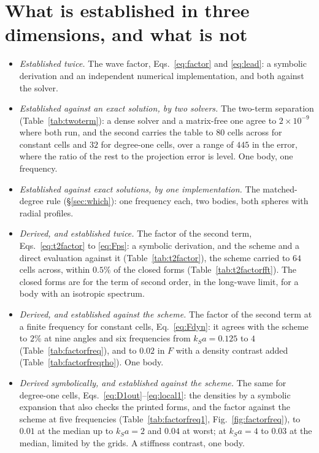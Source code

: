 \documentclass[11pt,a4paper]{article}
\begin{document}
\section{What is established in three dimensions, and what is not}\label{sec:status}

\begin{itemize}
\item \emph{Established twice.} The wave factor, Eqs.~\eqref{eq:factor} and \eqref{eq:lead}: a symbolic
derivation and an independent numerical implementation, and both against the solver.
\item \emph{Established against an exact solution, by two solvers.} The two-term separation
(Table~\ref{tab:twoterm}): a dense solver and a matrix-free one agree to $2\times10^{-9}$ where both
run, and the second carries the table to $80$ cells across for constant cells and $32$ for degree-one
cells, over a range of $445$ in the error, where the ratio of the rest to the projection error is level.
One body, one frequency.
\item \emph{Established against exact solutions, by one implementation.} The matched-degree rule
(\S\ref{sec:which}): one frequency each, two bodies, both spheres with radial profiles.
\item \emph{Derived, and established twice.} The factor of the second term, Eqs.~\eqref{eq:t2factor}
to \eqref{eq:Fps}: a symbolic derivation, and the scheme and a direct evaluation against it
(Table~\ref{tab:t2factor}), the scheme carried to $64$ cells across, within $0.5\%$ of the closed
forms (Table~\ref{tab:t2factorfft}). The closed forms are for the term of second order, in the long-wave
limit, for a body with an isotropic spectrum.
\item \emph{Derived, and established against the scheme.} The factor of the second term at a finite
frequency for constant cells, Eq.~\eqref{eq:Fdyn}: it agrees with the scheme to $2\%$ at nine angles and
six frequencies from $k_Sa=0.125$ to $4$ (Table~\ref{tab:factorfreq}), and to $0.02$ in $F$ with a density
contrast added (Table~\ref{tab:factorfreqrho}). One body.
\item \emph{Derived symbolically, and established against the scheme.} The same for degree-one cells,
Eqs.~\eqref{eq:D1out}--\eqref{eq:local1}: the densities by a symbolic expansion that also checks the
printed forms, and the factor against the scheme at five frequencies (Table~\ref{tab:factorfreq1},
Fig.~\ref{fig:factorfreq}), to $0.01$ at the median up to $k_Sa=2$ and $0.04$ at worst; at $k_Sa=4$ to
$0.03$ at the median, limited by the grids. A stiffness contrast, one body.

\end{itemize}
\end{document}
